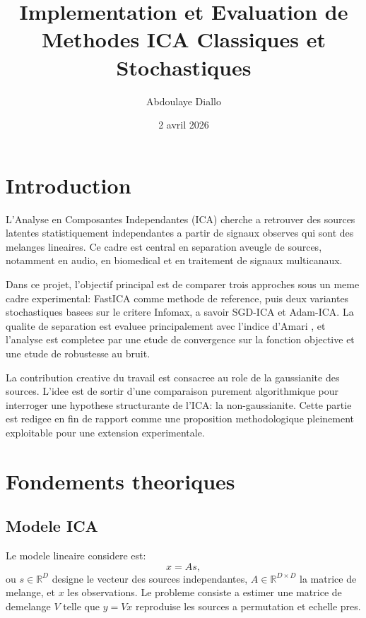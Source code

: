 \documentclass[11pt,a4paper]{article}
\title{Implementation et Evaluation de Methodes ICA Classiques et Stochastiques}
\author{Abdoulaye Diallo}
\date{2 avril 2026}
\begin{document}
\maketitle
\tableofcontents
\newpage

\section{Introduction}

L'Analyse en Composantes Independantes (ICA) cherche a retrouver des sources latentes statistiquement independantes a partir de signaux observes qui sont des melanges lineaires. Ce cadre est central en separation aveugle de sources, notamment en audio, en biomedical et en traitement de signaux multicanaux.

Dans ce projet, l'objectif principal est de comparer trois approches sous un meme cadre experimental: FastICA comme methode de reference, puis deux variantes stochastiques basees sur le critere Infomax, a savoir SGD-ICA et Adam-ICA. La qualite de separation est evaluee principalement avec l'indice d'Amari \cite{amari1996new}, et l'analyse est completee par une etude de convergence sur la fonction objective et une etude de robustesse au bruit.

La contribution creative du travail est consacree au role de la gaussianite des sources. L'idee est de sortir d'une comparaison purement algorithmique pour interroger une hypothese structurante de l'ICA: la non-gaussianite. Cette partie est redigee en fin de rapport comme une proposition methodologique pleinement exploitable pour une extension experimentale.

\section{Fondements theoriques}

\subsection{Modele ICA}

Le modele lineaire considere est:
\begin{equation}
x = A s,
\end{equation}
ou $s \in \mathbb{R}^D$ designe le vecteur des sources independantes, $A \in \mathbb{R}^{D \times D}$ la matrice de melange, et $x$ les observations. Le probleme consiste a estimer une matrice de demelange $V$ telle que $y = Vx$ reproduise les sources a permutation et echelle pres.
\end{document}
